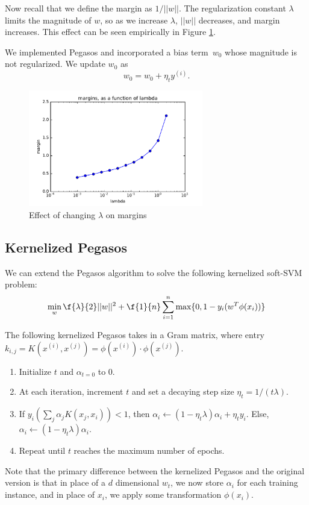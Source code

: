 \documentclass{article}
\begin{document}
\begin{multicols}{2}
Now recall that we define the margin as $1/||w||$. The regularization constant $\lambda$ limits the magnitude of $w$, so as we increase $\lambda$, $||w||$ decreases, and margin increases. This effect can be seen empirically in Figure \ref{fig:3-2-margins}.


We implemented Pegasos and incorporated a bias term~$w_0$ whose magnitude is not regularized.
We update $w_0$ as
\begin{equation}\label{eq:pegasos-svm}
    w_0 = w_0 + \eta_t y^{(i)}.
\end{equation}

\begin{figure}[h]
   \centering
	\includegraphics[width=3in]{img/3-2-margins.pdf}
   \caption{Effect of changing $\lambda$ on margins}
   \label{fig:3-2-margins}
\end{figure}

\subsection{Kernelized Pegasos}

We can extend the Pegasos algorithm
to solve the following kernelized soft-SVM problem:
\begin{equation}
   \min_w{\f{\lambda}{2}||w||^2} + \f{1}{n}\sum_{i=1}^n{\max\{0,1-y_i(w^T\phi(x_i))\}}
\end{equation}

The following kernelized Pegasos takes in a Gram matrix, where entry $k_{i,j} = K(x^{(i)},x^{(j)}) = \phi(x^{(i)})\cdot\phi(x^{(j)})$.
\begin{enumerate}
\item Initialize $t$ and $\alpha_{t=0}$ to 0.
\item At each iteration, increment $t$ and set a decaying step size $\eta_t = 1/(t\lambda)$.
\item If $y_i(\sum_j{\alpha_jK(x_j,x_i)})<1$, then $\alpha_{i}\leftarrow(1-\eta_t\lambda)\alpha_i+\eta_ty_i$. Else,  $\alpha_{i}\leftarrow(1-\eta_t\lambda)\alpha_i$.
\item Repeat until $t$ reaches the maximum number of epochs.
\end{enumerate}
Note that the primary difference between the kernelized Pegasos and the original version is that in place of a $d$ dimensional $w_t$, we now store $\alpha_i$ for each training instance, and in place of $x_i$, we apply some transformation $\phi(x_i)$.


\end{multicols}
\end{document}
